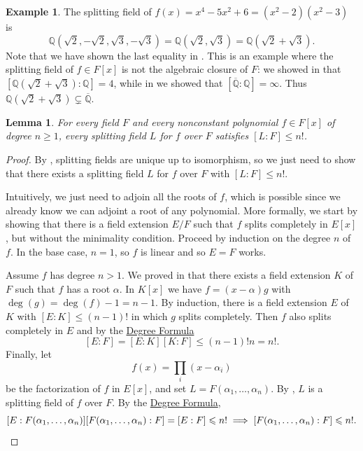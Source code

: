 \documentclass[12pt]{report}
\newtheorem{lemma}[theorem]{Lemma}
\numberwithin{equation}{section}
\numberwithin{theorem}{chapter}
\theoremstyle{definition}
\newtheorem{example}[theorem]{Example}
\newtheorem*{basic properties}{Basic Properties}
\newtheorem*{Important Remark}{Important Remark}
\begin{document}
\begin{example}
The splitting field of $f(x) = x^4 - 5x^2 + 6 = (x^2 - 2)(x^2 - 3)$ is $$\mathbb{Q}(\sqrt{2}, -\sqrt{2}, \sqrt{3}, -\sqrt{3}) = \mathbb{Q}(\sqrt{2}, \sqrt{3}) = \mathbb{Q}(\sqrt{2} + \sqrt{3}).$$
Note that we have shown the last equality in . This is an example where the splitting field of $f \in F[x]$ is not the algebraic closure of $F$: we showed in  that $[\mathbb{Q}(\sqrt{2} + \sqrt{3}) : \mathbb{Q}] = 4$, while in  we showed that $[\overline{\mathbb{Q}} : \mathbb{Q}] = \infty$. Thus $\mathbb{Q}(\sqrt{2} + \sqrt{3}) \subsetneq \overline{\mathbb{Q}}$.
\end{example}


\begin{lemma}\label{degree splitting field n!}
For every field $F$ and every nonconstant polynomial $f \in F[x]$ of degree $n \geqslant 1$, every splitting field $L$ for $f$ over $F$ satisfies $[L:F]\leqslant n!$.
\end{lemma}

\begin{proof} 
By , splitting fields are unique up to isomorphism, so we just need to show that there exists a splitting field $L$ for $f$ over $F$ with $[L:F]\leqslant n!$.

Intuitively, we just need to adjoin all the roots of $f$, which is possible since we already know we can adjoint a root of any polynomial. More formally, we start by showing that there is a field extension $E/F$ such that $f$ splits completely in $E[x]$, but without the minimality condition. Proceed by induction on the degree $n$ of $f$. In the base case, $n=1$, so $f$ is linear and so $E = F$ works.

Assume $f$ has degree $n>1$. We proved in  that there exists a field extension $K$ of $F$ such that $f$ has a root $\alpha$. 
In $K[x]$ we have $f= (x-\alpha) g$ with $\deg(g) = \deg(f)-1=n-1$. By induction, there is a field extension $E$ of $K$ with $[E:K] \leqslant (n-1)!$ in which $g$ splits completely. Then $f$ also splits completely in $E$ and by the \hyperref[deg formula]{Degree Formula}
$$[E:F]=[E:K][K:F] \leqslant (n-1)!n=n!.$$
Finally, let
$$f(x) = \prod_i (x - \alpha_i)$$ 
be the factorization of $f$ in $E[x]$, and set $L = F(\alpha_1, \dots, \alpha_n)$. By , $L$ is a splitting field of $f$ over $F$. By the \hyperref[deg formula]{Degree Formula},
$$[E:F(\alpha_1, \dots, \alpha_n)][F(\alpha_1, \dots, \alpha_n):F] = [E:F] \leqslant n! \implies [F(\alpha_1, \dots, \alpha_n):F] \leqslant n!.\qedhere$$
\end{proof}
\end{document}
